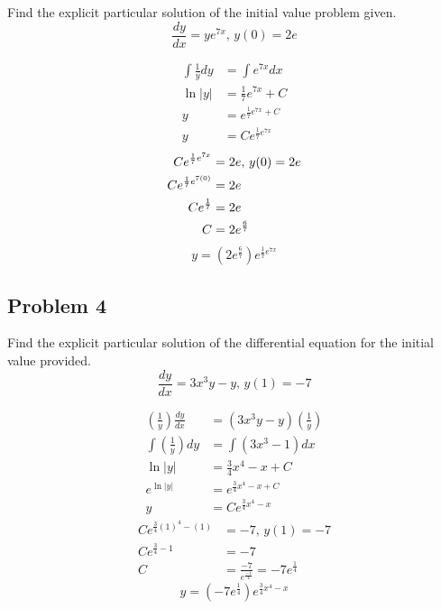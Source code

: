 \documentclass{article}
\begin{document}
Find the explicit particular solution of the initial value problem given.
$$ \frac{dy}{dx} = ye^{7x} \text{, } y(0) = 2e $$

\begin{align*}
    \int \frac{1}{y}dy & = \int e^{7x} dx \\
    \ln|y| & = \frac{1}{7}e^{7x} + C \\
    y & = e^{\frac{1}{7}e^{7x}+C} \\
    y & = Ce^{\frac{1}{7}e^{7x}}
\end{align*}
\begin{align*}
    Ce^{\frac{1}{7}e^{7x}} & = 2e \text{, $ y(0) = 2e $} \\
    Ce^{\frac{1}{7}e^{7(0)}} & = 2e \\
    Ce^{\frac{1}{7}} & = 2e \\
    C & = 2e^{\frac{6}{7}}
\end{align*}
\begin{equation*}
    \boxed{y = \left( 2e^\frac{6}{7} \right) e^{\frac{1}{7}e^{7x}}}
\end{equation*}

\subsection{Problem 4}

Find the explicit particular solution of the differential equation for the initial value provided.
$$ \frac{dy}{dx} = 3x^3y - y \text{, } y(1) = -7 $$

\begin{align*}
    \left( \frac{1}{y} \right) \frac{dy}{dx} & = \left( 3x^3y - y \right) \left( \frac{1}{y} \right) \\
    \int \left( \frac{1}{y} \right) dy & = \int \left( 3x^3 - 1 \right) dx \\
    \ln|y| & = \frac{3}{4}x^4 - x + C \\
    e^{\ln|y|} & = e^{\frac{3}{4}x^4 - x + C} \\
    y & = Ce^{\frac{3}{4}x^4 - x}
\end{align*}
\begin{align*}
    Ce^{\frac{3}{4}(1)^4 - (1)} & = -7 \text{, } y(1) = -7 \\
    Ce^{\frac{3}{4} - 1} & = -7 \\
    C & = \frac{-7}{e^{\frac{-1}{4}}} = -7e^{\frac{1}{4}}
\end{align*}
\begin{equation*}
    \boxed{y = \left( -7e^{\frac{1}{4}} \right) e^{\frac{3}{4}x^4 - x}}
\end{equation*}
\end{document}
